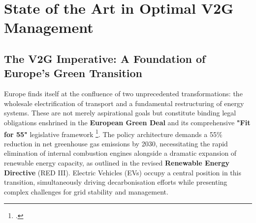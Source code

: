 \chapter{State of the Art in Optimal V2G Management}

\section{The V2G Imperative: A Foundation of Europe's Green Transition}

Europe finds itself at the confluence of two unprecedented transformations: the wholesale electrification of transport and a fundamental restructuring of energy systems. These are not merely aspirational goals but constitute binding legal obligations enshrined in the \textbf{European Green Deal} and its comprehensive \textbf{"Fit for 55"} legislative framework \footcite{european_commission_2021_fit_for_55}. The policy architecture demands a 55\% reduction in net greenhouse gas emissions by 2030, necessitating the rapid elimination of internal combustion engines alongside a dramatic expansion of renewable energy capacity, as outlined in the revised \textbf{Renewable Energy Directive }(RED III). Electric Vehicles (EVs) occupy a central position in this transition, simultaneously driving decarbonisation efforts while presenting complex challenges for grid stability and management.
\noindent


